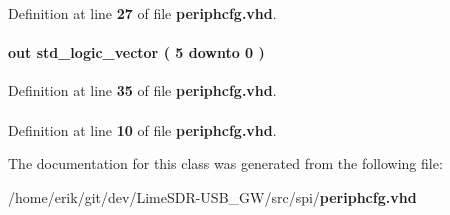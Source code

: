 Definition at line {\bf 27} of file {\bf periphcfg.\+vhd}.

\paragraph[{stateo}]{ {\bfseries \textcolor{keywordflow}{out}\textcolor{vhdlchar}{ }} {\bfseries \textcolor{comment}{std\+\_\+logic\+\_\+vector}\textcolor{vhdlchar}{ }\textcolor{vhdlchar}{(}\textcolor{vhdlchar}{ }\textcolor{vhdlchar}{ } \textcolor{vhdldigit}{5} \textcolor{vhdlchar}{ }\textcolor{keywordflow}{downto}\textcolor{vhdlchar}{ }\textcolor{vhdlchar}{ } \textcolor{vhdldigit}{0} \textcolor{vhdlchar}{ }\textcolor{vhdlchar}{)}\textcolor{vhdlchar}{ }} \hspace{0.3cm}{\ttfamily [Port]}}\label{classperiphcfg_abd6b61c99643f61b2f28f4ecbe116ef1}


Definition at line {\bf 35} of file {\bf periphcfg.\+vhd}.

\paragraph[{std\+\_\+logic\+\_\+1164}]{\hspace{0.3cm}{\ttfamily [Package]}}\label{classperiphcfg_acd03516902501cd1c7296a98e22c6fcb}


Definition at line {\bf 10} of file {\bf periphcfg.\+vhd}.



The documentation for this class was generated from the following file\+:\begin{DoxyCompactItemize}
\item 
/home/erik/git/dev/\+Lime\+S\+D\+R-\/\+U\+S\+B\+\_\+\+G\+W/src/spi/{\bf periphcfg.\+vhd}\end{DoxyCompactItemize}
